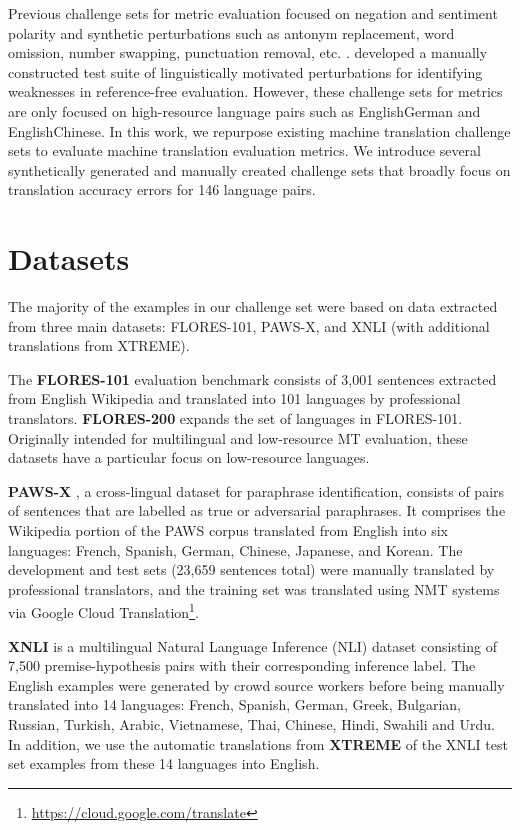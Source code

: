 \documentclass[11pt]{article}
\begin{document}
Previous challenge sets for metric evaluation focused on negation and sentiment polarity \citep{specia-etal-2020-findings} and synthetic perturbations such as antonym replacement, word omission, number swapping, punctuation removal, etc. \citep{freitag-etal-2021-results}. \citet{avramidis-etal-2018-fine} developed a manually constructed test suite of linguistically motivated perturbations for identifying weaknesses in reference-free evaluation. However, these challenge sets for metrics are only focused on high-resource language pairs such as EnglishGerman and EnglishChinese. In this work, we repurpose existing machine translation challenge sets to evaluate machine translation evaluation metrics. We introduce several synthetically generated and manually created challenge sets that broadly focus on translation accuracy errors for 146 language pairs.

\section{Datasets}
\label{sec:datasets}
The majority of the examples in our challenge set were based on data extracted from three main datasets: FLORES-101, PAWS-X, and XNLI (with additional translations from XTREME).

The \textbf{FLORES-101} evaluation benchmark \citep{goyal-etal-2022-flores} consists of 3,001 sentences extracted from English Wikipedia and translated into 101 languages by professional translators. \textbf{FLORES-200} \citep{flores-200} expands the set of languages in FLORES-101. Originally intended for multilingual and low-resource MT evaluation, these datasets have a particular focus on low-resource languages.

\textbf{PAWS-X} \citep{yang-etal-2019-paws}, a cross-lingual dataset for paraphrase identification, consists of pairs of sentences that are labelled as true or adversarial paraphrases. It comprises the Wikipedia portion of the PAWS corpus \citep{zhang-etal-2019-paws} translated from English into six languages: French, Spanish, German, Chinese, Japanese, and Korean. The development and test sets (23,659 sentences total) were manually translated by professional translators, and the training set was translated using NMT systems via Google Cloud Translation\footnote{\url{https://cloud.google.com/translate}}.

\textbf{XNLI} \citep{conneau-etal-2018-xnli} is a multilingual Natural Language Inference (NLI) dataset consisting of 7,500 premise-hypothesis pairs with their corresponding inference label. The English examples were generated by crowd source workers before being manually translated into 14 languages: French, Spanish, German, Greek, Bulgarian, Russian, Turkish, Arabic, Vietnamese, Thai, Chinese, Hindi, Swahili and Urdu. In addition, we use the automatic translations from \textbf{XTREME} \citep{hu2020xtreme} of the XNLI test set examples from these 14 languages into English.
\end{document}
